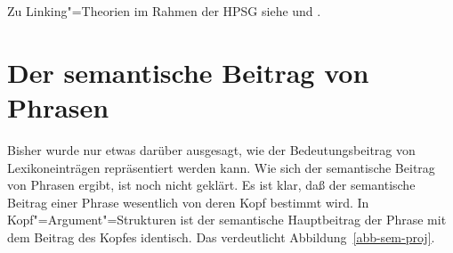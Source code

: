 Zu Linking"=Theorien im Rahmen der HPSG siehe  und .

\section{Der semantische Beitrag von Phrasen}
\label{sec-semp-i}

Bisher wurde nur etwas darüber ausgesagt, wie der Bedeutungsbeitrag von Lexikoneinträgen repräsentiert
werden kann. Wie sich der semantische Beitrag von Phrasen ergibt, ist noch nicht geklärt.
Es ist klar, daß der semantische Beitrag einer Phrase wesentlich von deren Kopf bestimmt
wird. In Kopf"=Argument"=Strukturen ist der semantische Hauptbeitrag der Phrase mit dem
Beitrag des Kopfes identisch. Das verdeutlicht Abbildung~\vref{abb-sem-proj}.
\begin{figure}[htp]
\centering%
\oneline{%
\begin{tabular}[t]{@{}c@{\hspace{4mm}}c@{\hspace{4mm}}c@{\hspace{4mm}}c@{\hspace{4mm}}c}%
\multicolumn{3}{l}{\rnode{1}{V[\begin{tabular}[t]{@{}l}
  \textit{fin\/}, \textsc{subcat} \sliste{ }]\\
  \end{tabular}}
}\\
\\*[4ex]
\rnode{2}{\ibox{1} NP[\textit{nom\/}]} & \multicolumn{2}{l}{\rnode{3}{V[\begin{tabular}[t]{@{}l}
                                                                    \textit{fin\/}, \textsc{subcat} \sliste{ \ibox{1} }]\\
                                                                    \end{tabular}}
                                                       }\\
\\*[4ex]
& \rnode{4}{\ibox{2} NP[\textit{acc\/}]} & \multicolumn{2}{l}{\rnode{5}{V[\begin{tabular}[t]{@{}l}
                                                                    \textit{fin\/}, \textsc{subcat} \sliste{ \ibox{1}, \ibox{2} }]\\
                                                                    \end{tabular}}
                                                       }\\

\end{tabular}}
\end{figure}
